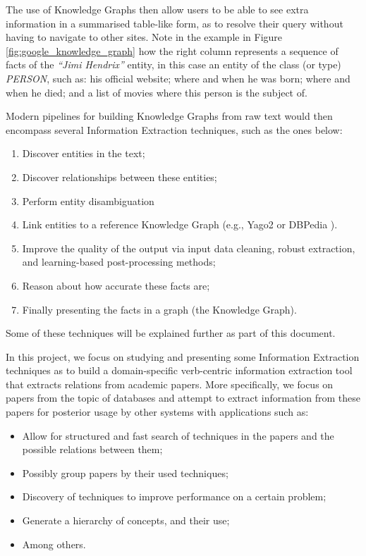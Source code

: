 \documentclass[11pt,a4paper,openright]{memoir}
\begin{document}
The use of Knowledge Graphs then allow users to be able to see extra information in a summarised table-like form, as to resolve their query without having to navigate to other sites. Note in the example in Figure \ref{fig:google_knowledge_graph} how the right column represents a sequence of facts of the \emph{\enquote{Jimi Hendrix}} entity, in this case an entity of the class (or type) \emph{PERSON}, such as: his official website; where and when he was born; where and when he died; and a list of movies where this person is the subject of.

Modern pipelines for building Knowledge Graphs from raw text would then encompass several Information Extraction techniques, such as the ones below:
\begin{enumerate}
  \item Discover entities in the text;
  \item Discover relationships between these entities;
  \item Perform entity disambiguation
  \item Link entities to a reference Knowledge Graph (e.g., Yago2 \cite{Suchanek2007} or DBPedia \cite{dbpedia-swj}).
  \item Improve the quality of the output via input data cleaning, robust extraction, and learning-based post-processing methods;
  \item Reason about how accurate these facts are;
  \item Finally presenting the facts in a graph (the Knowledge Graph).
\end{enumerate}

Some of these techniques will be explained further as part of this document.

In this project, we focus on studying and presenting some Information Extraction techniques as to build a domain-specific verb-centric information extraction tool that extracts relations from academic papers. More specifically, we focus on papers from the topic of databases and attempt to extract information from these papers for posterior usage by other systems with applications such as:
\begin{itemize}
	\item Allow for structured and fast search of techniques in the papers and the possible relations between them;
	\item Possibly group papers by their used techniques;
	\item Discovery of techniques to improve performance on a certain problem;
	\item Generate a hierarchy of concepts, and their use;
	\item Among others.
\end{itemize}
\end{document}
